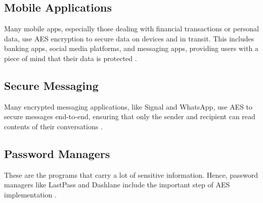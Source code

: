 \subsection{Mobile Applications}
Many mobile apps, especially those dealing with financial transactions or personal data, use \gls{AES} encryption to secure data on devices and in transit.
This includes banking apps, social media platforms, and messaging apps, providing users with a piece of mind that their data is protected \cite{cooper2025aes}.


\subsection{Secure Messaging}
Many encrypted messaging applications, like Signal and WhatsApp, use \gls{AES} to secure messages end-to-end, ensuring that only the sender and recipient can read contents of their conversations \cite{cooper2025aes}.


\subsection{Password Managers}
These are the programs that carry a lot of sensitive information.
Hence, password managers like LastPass and Dashlane include the important step of \gls{AES} implementation \cite{rimkiene2022aes}.
